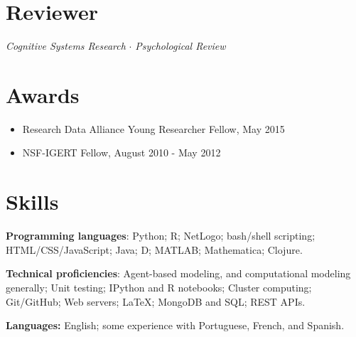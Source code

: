 \documentclass[letterpaper,11pt,oneside]{article}
\begin{document}
\noindent
\section*{\textcolor{gunmetal}{Reviewer}}

  \begin{hangparas}{0.25in}{1}
    \emph{Cognitive Systems Research} $\cdot$ \emph{Psychological Review} 
  \end{hangparas}

\noindent
\section*{\textcolor{gunmetal}{Awards}}
\begin{itemize}
  \item Research Data Alliance Young Researcher Fellow, May 2015
  \item NSF-IGERT Fellow, August 2010 - May 2012
\end{itemize}

\section*{\textcolor{gunmetal}{Skills}}

\begin{hangparas}{0.25in}{1}
  \textbf{Programming languages}: Python; R; NetLogo; bash/shell scripting; 
  HTML/CSS/JavaScript; Java; D; MATLAB; Mathematica; Clojure.

  \textbf{Technical proficiencies}: Agent-based modeling, and computational 
  modeling generally; Unit testing; IPython and R notebooks; Cluster computing;
  Git/GitHub; Web servers; \LaTeX; MongoDB and SQL; REST APIs.

  \textbf{Languages:} English; some experience with Portuguese, French,
  and Spanish. 
\end{hangparas}


\end{document}
